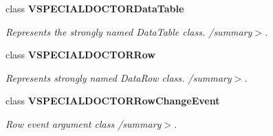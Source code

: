 \begin{CompactItemize}
class {\bf VSPECIALDOCTORDataTable}
\begin{CompactList}\small\item\em Represents the strongly named DataTable class. /summary$>$. \item\end{CompactList}\item 
class {\bf VSPECIALDOCTORRow}
\begin{CompactList}\small\item\em Represents strongly named DataRow class. /summary$>$. \item\end{CompactList}\item 
class {\bf VSPECIALDOCTORRowChangeEvent}
\begin{CompactList}\small\item\em Row event argument class /summary$>$. \item\end{CompactList}\end{CompactItemize}
